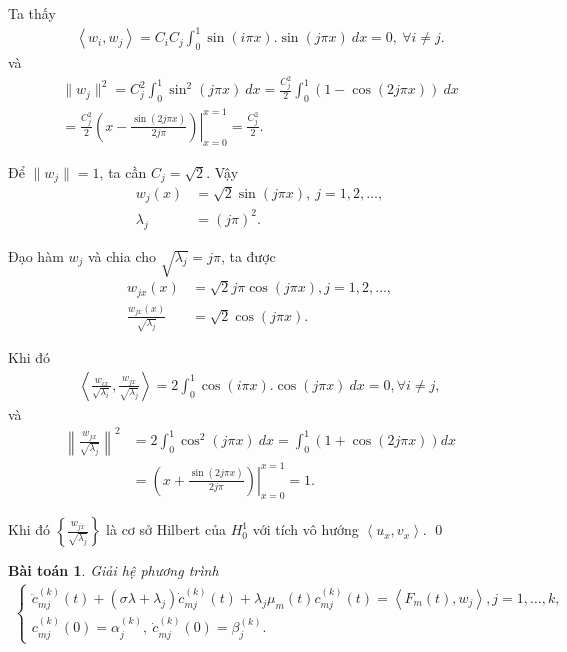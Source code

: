 \documentclass[12pt,a4paper]{article}
\newtheorem{theorem}{Bài toán}[section]
\theoremstyle{definition}
\begin{document}
Ta thấy
\begin{align*}
    \left<w_i, w_j\right> = C_i C_j \int_0^1 \sin(i\pi x). \sin(j\pi x)\:dx  = 0, \: \forall i \ne j.
\end{align*}
và
\begin{align*}
    \|w_j\|^2 = C_j^2 \int_0^1 \sin^2(j\pi x)\:dx
    = \frac{C_j^2}{2} \int_0^1 \left(1 - \cos(2j \pi x)\right)\:dx \\
    = \frac{C_j^2}{2} \left.\left(x - \frac{\sin(2j \pi x)}{2j \pi}\right)\right|_{x=0}^{x=1}
    = \frac{C_j^2}{2}.
\end{align*}

Để $\|w_j\| = 1$, ta cần $C_j = \sqrt{2}$. Vậy
\begin{align*}
    w_j(x) &= \sqrt{2} \sin(j \pi x), \: j = 1,2,\dots, \\
    \lambda_j &= (j\pi)^2.
\end{align*}

Đạo hàm $w_j$ và chia cho $\sqrt{\lambda_j} = j\pi$, ta được
\begin{align*}
    w_{jx}(x) &= \sqrt{2} j\pi \cos(j\pi x), j=1,2,\dots, \\
    \frac{w_{jx}(x)}{\sqrt{\lambda_j}} &= \sqrt{2} \cos(j\pi x).
\end{align*}

Khi đó
\begin{align*}
    \left<\frac{w_{ix}}{\sqrt{\lambda_i}}, \frac{w_{jx}}{\sqrt{\lambda_j}}\right>
    = 2 \int_0^1 \cos(i\pi x). \cos(j\pi x)\: dx = 0, \forall i \ne j,
\end{align*}
và
\begin{align*}
    \left\|\frac{w_{jx}}{\sqrt{\lambda_j}}\right\|^2
    &= 2 \int_0^1 \cos^2 (j \pi x)\:dx
    = \int_0^1 \left(1 + \cos(2j\pi x)\right)dx \\
    &= \left.\left(x + \frac{\sin(2j\pi x)}{2j\pi}\right)\right|_{x=0}^{x=1}
    = 1.
\end{align*}

Khi đó $\left\{\frac{w_{jx}}{\sqrt{\lambda_j}}\right\}$ là cơ sở Hilbert của $H^1_0$ với tích vô hướng $\left<u_x,v_x\right>$. \qed

\begin{theorem}
    Giải hệ phương trình
    \begin{align*}
    \begin{cases}
        \ddot{c}_{mj}^{(k)}(t)
        + (\sigma \lambda + \lambda_j) \dot{c}_{mj}^{(k)}(t)
        + \lambda_j \mu_m(t) c_{mj}^{(k)}(t)
        = \left<F_m(t), w_j\right>, j = 1,\dots,k, \\
        c_{mj}^{(k)}(0) = \alpha_j^{(k)}, \: \dot{c}_{mj}^{(k)}(0) = \beta_j^{(k)}.
    \end{cases}
    \end{align*}
\end{theorem}
\end{document}
